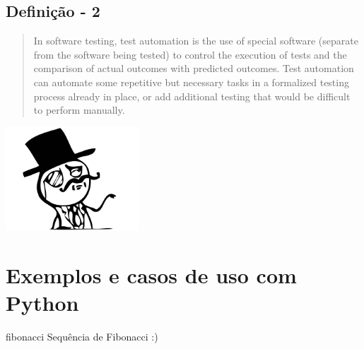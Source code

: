 \documentclass[]{beamer}
\begin{document}
  \subsection*{Definição - 2}
  \backbgcolor
  \begin{frame}
    \blockquote[{\cite[Wikipedia]{_test_2014}}]{
      In software testing, test automation is the use of special software
      (separate from the software being tested) to control the execution of
      tests and the comparison of actual outcomes with predicted outcomes. Test
      automation can automate some repetitive but necessary tasks in a
      formalized testing process already in place, or add additional testing
      that would be difficult to perform manually.
    }
  \end{frame}

  \invertbgcolor
  \begin{frame}{}
    \begin{center}
      \includegraphics[width=5cm]{images/likeasir}
    \end{center}
  \end{frame}

  \backbgcolor
  \section{Exemplos e casos de uso com Python}

  \begin{frame}{fibonacci}
    Sequência de Fibonacci :)
  \end{frame}

  
  
\end{document}
